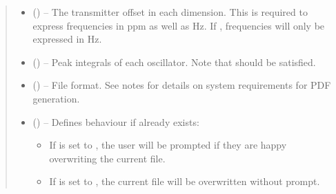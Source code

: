 \documentclass[letterpaper,10pt,english]{sphinxmanual}
\begin{document}
\begin{fulllineitems}
\begin{quote}
\begin{description}
\begin{itemize}
\item {} 
\sphinxAtStartPar
{} (\sphinxstyleliteralemphasis{\sphinxupquote{{[}}}\sphinxstyleliteralemphasis{\sphinxupquote{{]}}}\sphinxstyleliteralemphasis{\sphinxupquote{, }}\sphinxstyleliteralemphasis{\sphinxupquote{{[}}}\sphinxstyleliteralemphasis{\sphinxupquote{, }}\sphinxstyleliteralemphasis{\sphinxupquote{{]} or }}) – The transmitter offset in each dimension. This is required to
express frequencies in ppm as well as Hz. If , frequencies
will only be expressed in Hz.

\item {} 
\sphinxAtStartPar
{} () – Peak integrals of each oscillator. Note that
 should be satisfied.

\item {} 
\sphinxAtStartPar
{} (\sphinxstyleliteralemphasis{\sphinxupquote{, }}\sphinxstyleliteralemphasis{\sphinxupquote{, }}) – File format. See notes for details on system requirements for PDF
generation.

\item {} 
\sphinxAtStartPar
{} () – 
\sphinxAtStartPar
Defines behaviour if  already exists:
\begin{itemize}
\item {} 
\sphinxAtStartPar
If  is set to , the user will be prompted
if they are happy overwriting the current file.

\item {} 
\sphinxAtStartPar
If  is set to , the current file will be
overwritten without prompt.


\end{itemize}
\end{itemize}
\end{description}
\end{quote}
\end{fulllineitems}
\end{document}
